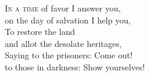
\lettrine{I}{n a time} of favor I answer you,\\
on the day of salvation I help you,\\
To restore the land\\
and allot the desolate heritages,\\
Saying to the prisoners: Come out!\\
to those in darkness: Show yourselves!
